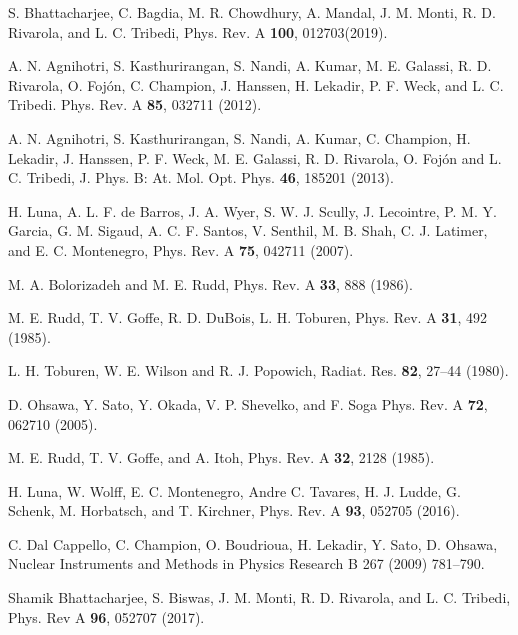 \documentclass[10pt,showpacs,showkeys,twocolumn]{revtex4-1} %
\begin{document}
\begin{thebibliography}{}
S. Bhattacharjee, C. Bagdia, M. R. Chowdhury, A. Mandal, J. M. Monti, 
R. D. Rivarola, and L. C. Tribedi, 
Phys. Rev. A \textbf{100}, 012703(2019).

A. N. Agnihotri, S. Kasthurirangan, S. Nandi, A. Kumar, M. E. Galassi, 
R. D. Rivarola, O. Foj\'on, C. Champion, J. Hanssen, H. Lekadir, 
P. F. Weck, and L. C. Tribedi. 
Phys. Rev. A \textbf{85}, 032711 (2012).

A. N. Agnihotri, S. Kasthurirangan, S. Nandi, A. Kumar, C. Champion, 
H. Lekadir, J. Hanssen, P. F. Weck, M. E. Galassi, R. D. Rivarola, 
O. Foj\'on and L. C. Tribedi, 
J. Phys. B: At. Mol. Opt. Phys. \textbf{46}, 185201 (2013).

H. Luna, A. L. F. de Barros, J. A. Wyer, S. W. J. Scully, J. Lecointre, 
P. M. Y. Garcia, G. M. Sigaud, A. C. F. Santos, V. Senthil, M. B. Shah, 
C. J. Latimer, and E. C. Montenegro,
Phys. Rev. A \textbf{75}, 042711 (2007).

M. A. Bolorizadeh and M. E. Rudd, 
Phys. Rev. A \textbf{33}, 888 (1986). 

M. E. Rudd, T. V. Goffe, R. D. DuBois, L. H. Toburen, 
Phys. Rev. A \textbf{31}, 492 (1985). 

L. H. Toburen, W. E. Wilson and R. J. Popowich,
Radiat. Res. \textbf{82}, 27--44 (1980).

D. Ohsawa, Y. Sato, Y. Okada, V. P. Shevelko, and F. Soga
Phys. Rev. A \textbf{72}, 062710 (2005).

M. E. Rudd, T. V. Goffe, and A. Itoh, 
Phys. Rev. A \textbf{32}, 2128 (1985).


H. Luna, W. Wolff, E. C. Montenegro, Andre C. Tavares, H. J. Ludde, 
G. Schenk, M. Horbatsch, and T. Kirchner, 
Phys. Rev. A \textbf{93}, 052705 (2016).  

C. Dal Cappello, C. Champion, O. Boudrioua, H. Lekadir, Y. Sato, 
D. Ohsawa, 
Nuclear Instruments and Methods in Physics Research B 267 (2009) 781--790.

Shamik Bhattacharjee, S. Biswas, J. M. Monti, R. D. Rivarola, and 
L. C. Tribedi,
Phys. Rev A \textbf{96}, 052707 (2017).


\end{thebibliography}
\end{document}
